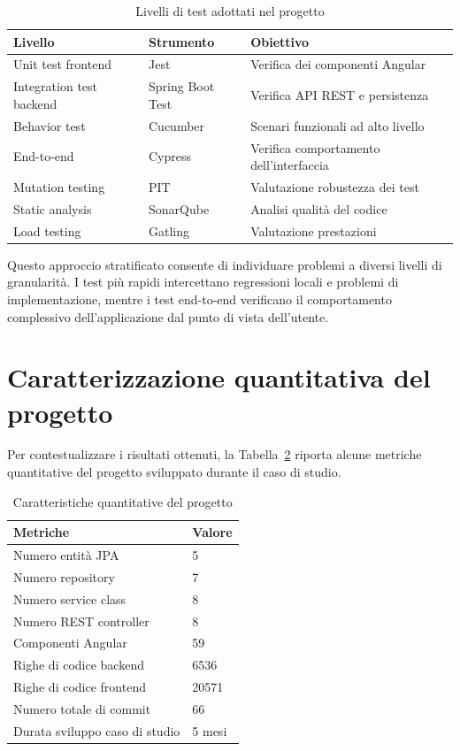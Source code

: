 \begin{table}[H]
	\centering
	\caption{Livelli di test adottati nel progetto}
	\label{tab:testing-levels}
	\begin{tabular}{lll}
		\hline
		Livello & Strumento & Obiettivo \\
		\hline
		Unit test frontend & Jest & Verifica dei componenti Angular \\
		Integration test backend & Spring Boot Test & Verifica API REST e persistenza \\
		Behavior test & Cucumber & Scenari funzionali ad alto livello \\
		End-to-end & Cypress & Verifica comportamento dell'interfaccia \\
		Mutation testing & PIT & Valutazione robustezza dei test \\
		Static analysis & SonarQube & Analisi qualità del codice \\
		Load testing & Gatling & Valutazione prestazioni \\
		\hline
	\end{tabular}
\end{table}

Questo approccio stratificato consente di individuare problemi a diversi livelli di granularità. I test più rapidi intercettano regressioni locali e problemi di implementazione, mentre i test end-to-end verificano il comportamento complessivo dell'applicazione dal punto di vista dell'utente.

\section{Caratterizzazione quantitativa del progetto}
\label{sec:evaluation-project-metrics}

Per contestualizzare i risultati ottenuti, la Tabella~\ref{tab:project-size} riporta alcune metriche quantitative del progetto sviluppato durante il caso di studio.

\begin{table}[H]
	\centering
	\caption{Caratteristiche quantitative del progetto}
	\label{tab:project-size}
	\begin{tabular}{ll}
		\hline
		Metriche & Valore \\
		\hline
		Numero entità JPA & 5 \\
		Numero repository & 7 \\
		Numero service class & 8 \\
		Numero REST controller & 8 \\
		Componenti Angular & 59 \\
		Righe di codice backend & 6536 \\
		Righe di codice frontend & 20571 \\
		Numero totale di commit & 66 \\
		Durata sviluppo caso di studio & 5 mesi \\
		\hline
	\end{tabular}
\end{table}

